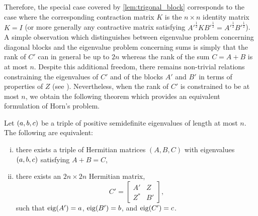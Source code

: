 \documentclass[notitlepage, 10pt]{article}
\begin{document}
Therefore, the special case covered by \cref{lem:trigonal_block} corresponds to the case where the corresponding contraction matrix $K$ is the $n\times n$ identity matrix $K=I$ (or more generally any contractive matrix satisfying $A'^{\frac{1}{2}} K B'^{\frac{1}{2}} = A'^{\frac{1}{2}} B'^{\frac{1}{2}}$).
A simple observation which distinguishes between eigenvalue problem concerning diagonal blocks and the eigenvalue problem concerning sums is simply that the rank of $C'$ can in general be up to $2n$ whereas the rank of the sum $C = A+B$ is at most $n$.
Despite this additional freedom, there remains non-trivial relations constraining the eigenvalues of $C'$ and of the blocks $A'$ and $B'$ in terms of properties of $Z$ (see \cite{gumus2018positive,bourin2022eigenvalue}).
Nevertheless, when the rank of $C'$ is constrained to be at most $n$, we obtain the following theorem which provides an equivalent formulation of Horn's problem.
\begin{thm}
    \label{thm:trigonal_block}
    Let $(a,b,c)$ be a triple of positive semidefinite eigenvalues of length at most $n$.
    The following are equivalent:
    \begin{enumerate}[(i)]
        \item there exists a triple of Hermitian matrices $(A,B,C)$ with eigenvalues $(a,b,c)$ satisfying $A+B=C$,
        \item there exists an $2n \times 2n$ Hermitian matrix,
            \begin{equation}
                C' = \begin{bmatrix}
                    A' & Z \\
                    Z^{*} & B'
                \end{bmatrix},
            \end{equation}
            such that $\operatorname{eig}(A') = a$, $\operatorname{eig}(B') = b$, and $\operatorname{eig}(C') = c$.
    \end{enumerate}
\end{thm}
\end{document}
